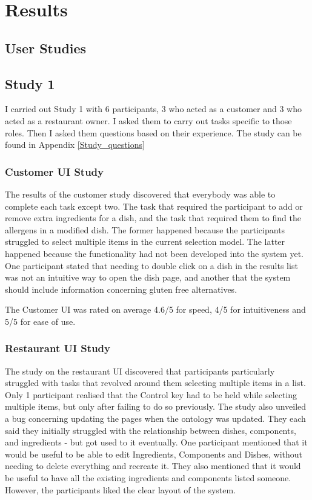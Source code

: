 \chapter{Results}

\section{User Studies}

\section{Study 1}
\label{Study1Results}

I carried out Study 1 with 6 participants, 3 who acted as a customer and 3 who acted as a restaurant owner. I asked them to carry out tasks specific to those roles. Then I asked them questions based on their experience. The study can be found in Appendix \ref{Study_questions}

\subsection{Customer UI Study}

The results of the customer study discovered that everybody was able to complete each task except two. The task that required the participant to add or remove extra ingredients for a dish, and the task that required them to find the allergens in a modified dish. The former happened because the participants struggled to select multiple items in the current selection model. The latter happened because the functionality had not been developed into the system yet. One participant stated that needing to double click on a dish in the results list was not an intuitive way to open the dish page, and another that the system should include information concerning gluten free alternatives.

The Customer UI was rated on average 4.6/5 for speed, 4/5 for intuitiveness and 5/5 for ease of use.

\subsection{Restaurant UI Study}

The study on the restaurant UI discovered that participants particularly struggled with tasks that revolved around them selecting multiple items in a list. Only 1 participant realised that the Control key had to be held while selecting multiple items, but only after failing to do so previously. The study also unveiled a bug concerning updating the pages when the ontology was updated. They each said they initially struggled with the relationship between dishes, components, and ingredients - but got used to it eventually. One participant mentioned that it would be useful to be able to edit Ingredients, Components and Dishes, without needing to delete everything and recreate it. They also mentioned that it would be useful to have all the existing ingredients and components listed someone. However, the participants liked the clear layout of the system. 

